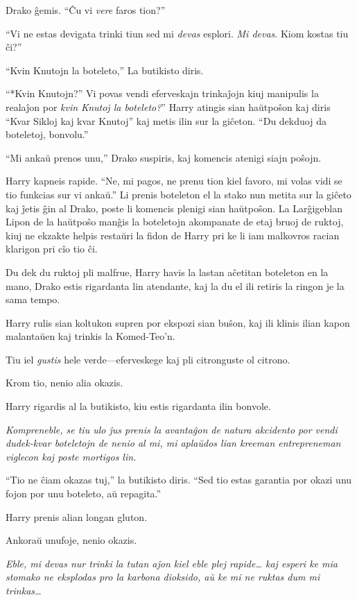 Drako ĝemis. ``Ĉu vi \emph{vere} faros tion?''

``Vi ne estas devigata trinki tiun sed mi \emph{devas}
esplori. \emph{Mi devas}. Kiom kostas tiu ĉi?''

``Kvin Knutojn la boteleto,'' La butikisto diris.

``*Kvin Knutojn?'' Vi povas vendi eferveskajn trinkaĵojn kiuj manipulis la
realaĵon por \emph{kvin Knutoj la boteleto?}'' Harry atingis sian
haŭtpoŝon kaj diris ``Kvar Sikloj kaj kvar Knutoj'' kaj metis ilin sur la
giĉeton. ``Du dekduoj da boteletoj, bonvolu.'' 

``Mi ankaŭ prenos unu,'' Drako suspiris, kaj komencis atenigi siajn
poŝojn.

Harry kapneis rapide. ``Ne, mi pagos, ne prenu tion kiel favoro, mi
volas vidi se tio funkcias sur vi ankaŭ.''  Li prenis boteleton el la
stako nun metita sur la giĉeto kaj ĵetis ĝin al Drako, poste li
komencis plenigi sian haŭtpoŝon. La Larĝigeblan Lipon de la haŭtpoŝo
manĝis la boteletojn akompanate de etaj bruoj de ruktoj, kiuj ne
ekzakte helpis restaŭri la fidon de Harry pri ke li iam malkovros
racian klarigon pri cîo tio ĉi.

Du dek du ruktoj pli malfrue, Harry havis la lastan aĉetitan boteleton
en la mano, Drako estis rigardanta lin atendante, kaj la du el ili
retiris la ringon je la sama tempo.

Harry rulis sian koltukon supren por ekspozi sian buŝon, kaj ili klinis
ilian kapon malantaŭen kaj trinkis la Komed-Teo'n.

Tiu iel \emph{gustis} hele verde—eferveskege kaj pli citronguste ol
citrono.

Krom tio, nenio alia okazis.

Harry rigardis al la butikisto, kiu estis rigardanta ilin bonvole.

\emph{Kompreneble, se tiu ulo ĵus prenis la avantaĝon de natura
akcidento por vendi dudek-kvar boteletojn de nenio al mi, mi
aplaŭdos lian kreeman entrepreneman viglecon kaj poste mortigos lin.}

``Tio ne ĉiam okazas tuj,'' la butikisto diris. ``Sed tio estas
garantia por okazi unu fojon por unu boteleto, aŭ repagita.''

Harry prenis alian longan gluton.

Ankoraŭ unufoje, nenio okazis.

\emph{Eble, mi devas nur trinki la tutan aĵon kiel eble plej rapide\ldots
kaj esperi ke mia stomako ne eksplodas pro la karbona dioksido, aŭ
ke mi ne ruktas dum mi trinkas\ldots}

